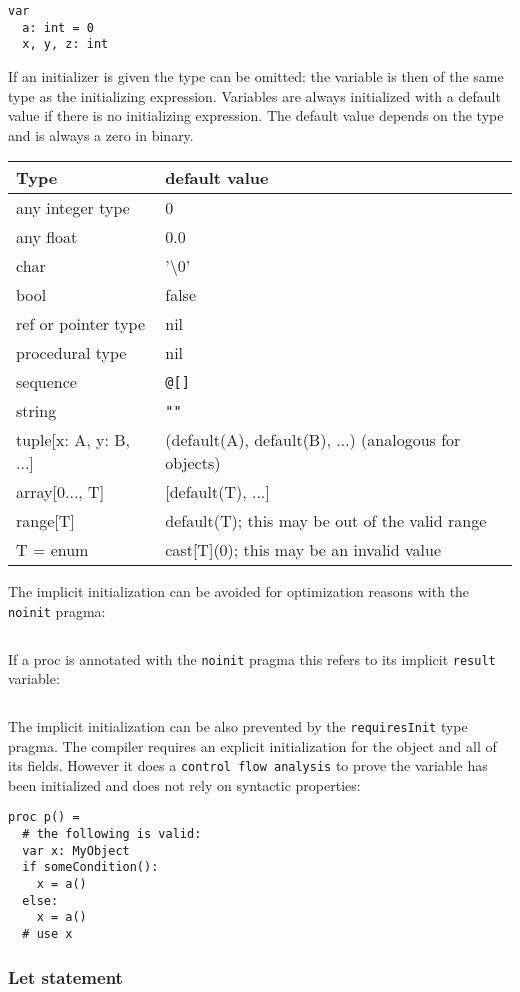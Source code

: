 \begin{verbatim}
var
  a: int = 0
  x, y, z: int
\end{verbatim}

If an initializer is given the type can be omitted: the variable is then
of the same type as the initializing expression. Variables are always
initialized with a default value if there is no initializing expression.
The default value depends on the type and is always a zero in binary.

\begin{longtable}[]{@{}ll@{}}
\toprule
Type & default value\tabularnewline
\midrule
\endhead
any integer type & 0\tabularnewline
any float & 0.0\tabularnewline
char & '\textbackslash0'\tabularnewline
bool & false\tabularnewline
ref or pointer type & nil\tabularnewline
procedural type & nil\tabularnewline
sequence & \texttt{@{[}{]}}\tabularnewline
string & \texttt{""}\tabularnewline
tuple{[}x: A, y: B, ...{]} & (default(A), default(B), ...) (analogous
for objects)\tabularnewline
array{[}0..., T{]} & {[}default(T), ...{]}\tabularnewline
range{[}T{]} & default(T); this may be out of the valid
range\tabularnewline
T = enum & cast{[}T{]}(0); this may be an invalid value\tabularnewline
\bottomrule
\end{longtable}

The implicit initialization can be avoided for optimization reasons with
the \texttt{noinit} pragma:

\begin{verbatim}
\end{verbatim}

If a proc is annotated with the \texttt{noinit} pragma this refers to
its implicit \texttt{result} variable:

\begin{verbatim}
\end{verbatim}

The implicit initialization can be also prevented by the
\texttt{requiresInit} type pragma. The compiler requires an explicit
initialization for the object and all of its fields. However it does a
\texttt{control\ flow\ analysis} to prove the variable has been
initialized and does not rely on syntactic properties:

\begin{verbatim}
proc p() =
  # the following is valid:
  var x: MyObject
  if someCondition():
    x = a()
  else:
    x = a()
  # use x
\end{verbatim}

\hypertarget{let-statement}{%
\subsubsection{Let statement}\label{let-statement}}


